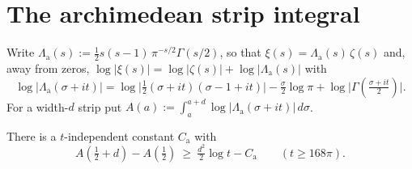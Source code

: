 \section{The archimedean strip integral}
\label{sec:ll_arch}

Write $\Lambda_{\mathrm a}(s):=\tfrac12 s(s-1)\,\pi^{-s/2}\Gamma(s/2)$, so that
$\xi(s)=\Lambda_{\mathrm a}(s)\,\zeta(s)$ and, away from zeros,
$\log|\xi(s)|=\log|\zeta(s)|+\log|\Lambda_{\mathrm a}(s)|$ with
\[
  \log|\Lambda_{\mathrm a}(\sigma+it)|
  =\log\bigl|\tfrac12(\sigma+it)(\sigma-1+it)\bigr|-\tfrac\sigma2\log\pi
   +\log\bigl|\Gamma(\tfrac{\sigma+it}2)\bigr|.
\]
For a width-$d$ strip put $A(a):=\int_a^{a+d}\log|\Lambda_{\mathrm a}(\sigma+it)|\,d\sigma$.

\begin{lemma}
\label{lem:ll_arch}
\leanok
{}
There is a $t$-independent constant $C_{\mathrm a}$ with
\[
  A\!\left(\tfrac12+d\right)-A\!\left(\tfrac12\right)\ \ge\ \tfrac{d^2}2\log t-C_{\mathrm a}
  \qquad(t\ge168\pi).
\]
\end{lemma}

